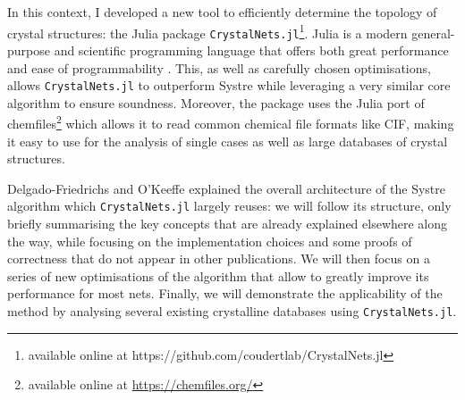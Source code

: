 \documentclass[main.tex]{subfiles}
\begin{document}

\medskip

In this context, I developed a new tool to efficiently determine the topology of crystal structures: the Julia package \texttt{CrystalNets.jl}\footnote{available online at https://github.com/coudertlab/CrystalNets.jl}. Julia \autocite{Julia} is a modern general-purpose and scientific programming language that offers both great performance and ease of programmability \autocite{JuliaDesign}. This, as well as carefully chosen optimisations, allows \texttt{CrystalNets.jl} to outperform Systre while leveraging a very similar core algorithm to ensure soundness. Moreover, the package uses the Julia port of chemfiles\footnote{available online at \url{https://chemfiles.org/}} which allows it to read common chemical file formats like CIF, making it easy to use for the analysis of single cases as well as large databases of crystal structures.

Delgado-Friedrichs and O'Keeffe \autocite{Systre} explained the overall architecture of the Systre algorithm which \texttt{CrystalNets.jl} largely reuses: we will follow its structure, only briefly summarising the key concepts that are already explained elsewhere along the way, while focusing on the implementation choices and some proofs of correctness that do not appear in other publications. We will then focus on a series of new optimisations of the algorithm that allow to greatly improve its performance for most nets. Finally, we will demonstrate the applicability of the method by analysing several existing crystalline databases using \texttt{CrystalNets.jl}.
\end{document}
